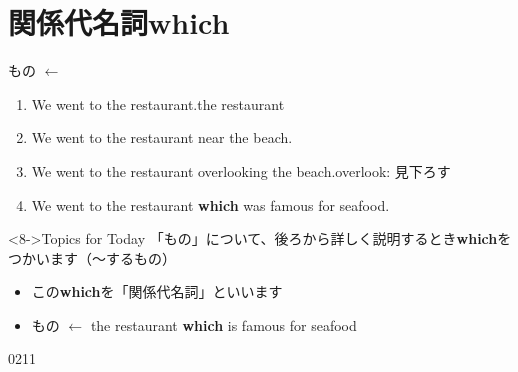\documentclass[aspectratio=169,xcolor={dvipsnames,table}]{beamer}
\begin{document}
\section{関係代名詞which }
\begin{frame}[plain,t]{もの $\leftarrow$ }
 \begin{enumerate}
  \item<1-> We went to the restaurant.\hfill{\scriptsize the restaurant}
  \item<2-> We went to the restaurant near the beach.%
        \hfill{}
  \item<4-> We went to the restaurant overlooking the beach.\hfill{\scriptsize overlook: 見下ろす}\\%
        \hfill{}
  \item<6-> We went to the restaurant \textbf{which} was famous for seafood.\\%
        \hfill{}
 \end{enumerate}

\vspace{20pt}

\begin{block}<8->{Topics for Today}\small
「もの」について、後ろから詳しく説明するとき\textbf{which}をつかいます（～するもの）

\begin{itemize}[square]\small
 \item この\textbf{which}を「関係代名詞」といいます
 \item もの\,\,$\longleftarrow$\,\,\hfill{\scriptsize the restaurant \textbf{which} is famous for seafood}
 \end{itemize}
     \end{block}
\vspace{-10pt}

\hfill{\tiny 0211}\,{\scriptsize {}}

\end{frame}
\end{document}
